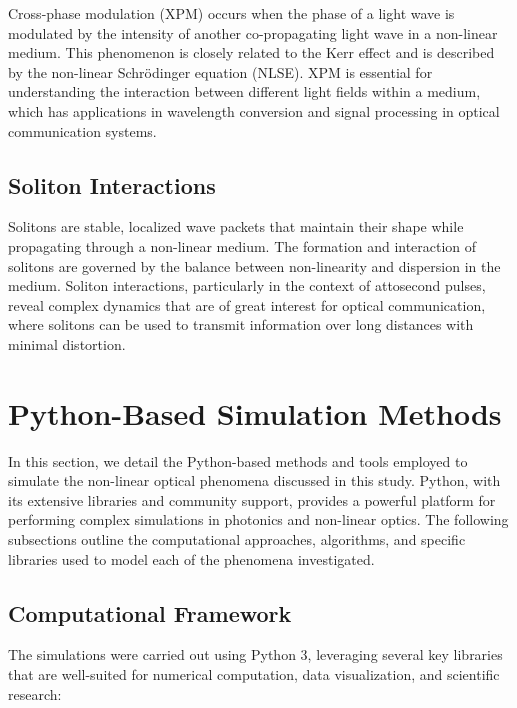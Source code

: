 \documentclass[12pt]{article}
\begin{document}
Cross-phase modulation (XPM) occurs when the phase of a light wave is modulated by the intensity of another co-propagating light wave in a non-linear medium. This phenomenon is closely related to the Kerr effect and is described by the non-linear Schrödinger equation (NLSE). XPM is essential for understanding the interaction between different light fields within a medium, which has applications in wavelength conversion and signal processing in optical communication systems.

\subsection{Soliton Interactions}

Solitons are stable, localized wave packets that maintain their shape while propagating through a non-linear medium. The formation and interaction of solitons are governed by the balance between non-linearity and dispersion in the medium. Soliton interactions, particularly in the context of attosecond pulses, reveal complex dynamics that are of great interest for optical communication, where solitons can be used to transmit information over long distances with minimal distortion.

\newpage

\section{Python-Based Simulation Methods}\label{sec:simulation}

In this section, we detail the Python-based methods and tools employed to simulate the non-linear optical phenomena discussed in this study. Python, with its extensive libraries and community support, provides a powerful platform for performing complex simulations in photonics and non-linear optics. The following subsections outline the computational approaches, algorithms, and specific libraries used to model each of the phenomena investigated.

\subsection{Computational Framework}

The simulations were carried out using Python 3, leveraging several key libraries that are well-suited for numerical computation, data visualization, and scientific research:
\end{document}
